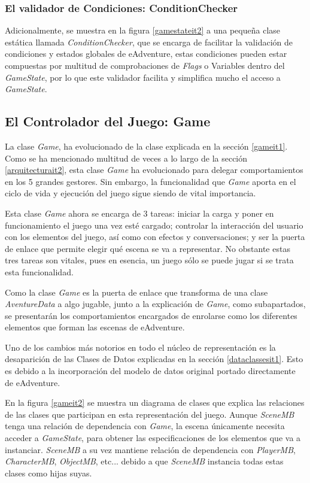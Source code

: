 \subsubsection{El validador de Condiciones: ConditionChecker}

Adicionalmente, se muestra en la figura \ref{gamestateit2} a una pequeña clase estática llamada \textit{ConditionChecker}, que se encarga de facilitar la validación de condiciones y estados globales de eAdventure, estas condiciones pueden estar compuestas por multitud de comprobaciones de \textit{Flags} o Variables dentro del \textit{GameState}, por lo que este validador facilita y simplifica mucho el acceso a \textit{GameState}.

\subsection{El Controlador del Juego: Game}
\label{gamesectionit2}

La clase \textit{Game}, ha evolucionado de la clase explicada en la sección \ref{gameit1}. Como se ha mencionado multitud de veces a lo largo de la sección \ref{arquitecturait2}, esta clase \textit{Game} ha evolucionado para delegar comportamientos en los 5 grandes gestores. Sin embargo, la funcionalidad que \textit{Game} aporta en el ciclo de vida y ejecución del juego sigue siendo de vital importancia.

Esta clase \textit{Game} ahora se encarga de 3 tareas: iniciar la carga y poner en funcionamiento el juego una vez esté cargado; controlar la interacción del usuario con los elementos del juego, así como con efectos y conversaciones; y ser la puerta de enlace que permite elegir qué escena se va a representar. No obstante estas tres tareas son vitales, pues en esencia, un juego sólo se puede jugar si se trata esta funcionalidad.

Como la clase \textit{Game} es la puerta de enlace que transforma de una clase \textit{AventureData} a algo jugable, junto a la explicación de \textit{Game}, como subapartados, se presentarán los comportamientos encargados de enrolarse como los diferentes elementos que forman las escenas de eAdventure.

Uno de los cambios más notorios en todo el núcleo de representación es la desaparición de las Clases de Datos explicadas en la sección \ref{dataclassesit1}. Esto es debido a la incorporación del modelo de datos original portado directamente de eAdventure.

En la figura \ref{gameit2} se muestra un diagrama de clases que explica las relaciones de las clases que participan en esta representación del juego. Aunque \textit{SceneMB} tenga una relación de dependencia con \textit{Game}, la escena únicamente necesita acceder a \textit{GameState}, para obtener las especificaciones de los elementos que va a instanciar. \textit{SceneMB} a su vez mantiene relación de dependencia con \textit{PlayerMB}, \textit{CharacterMB}, \textit{ObjectMB}, etc... debido a que \textit{SceneMB} instancia todas estas clases como hijas suyas.


